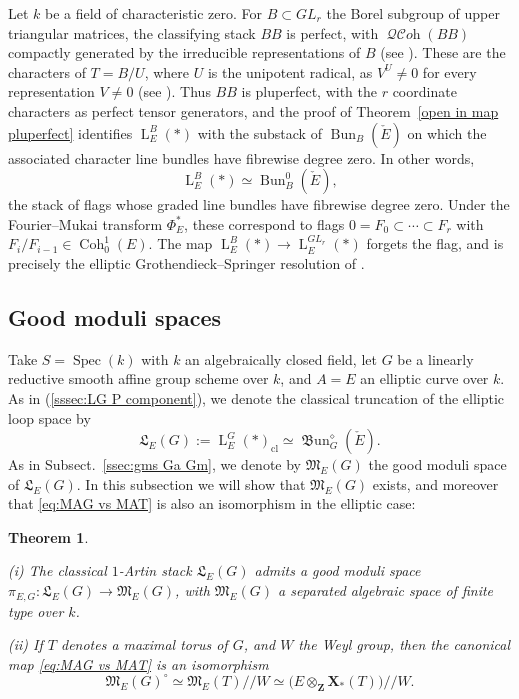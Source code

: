 \documentclass[12pt, oneside]{amsart}
\numberwithin{equation}{section}
\newtheorem{theorem}[subsubsection]{Theorem}
\theoremstyle{remark}
\theoremstyle{plain}
\DeclareMathOperator{\QCOH}{\mathcal{QC}\textit{oh}}
\newcommand{\frM}{\mathfrak{M}}
\newcommand{\frL}{\mathfrak{L}}
\newcommand{\Loop}{\operatorname{L}}
\DeclareMathOperator{\spc}{Spec}
\newcommand{\modmod}{/\!\!/}
\newcommand{\bZ}{\mathbf{Z}}
\newcommand{\FM}{\Phi}
\newcommand{\cl}{{\operatorname{cl}}}
\newcommand{\frBun}{\operatorname{\mathfrak{B}un}}
\begin{document}
Let $k$ be a field of characteristic zero.
For $B \subset GL_r$ the Borel subgroup of upper triangular matrices, the classifying stack $BB$ is perfect, with $\QCOH(BB)$ compactly generated by the irreducible representations of $B$ (see \cite[Thm.~A(c)]{HallRydh}).
These are the characters of $T = B/U$, where $U$ is the unipotent radical, as $V^U \neq 0$ for every representation $V \neq 0$ (see \cite[Exp.~XVII, Prop.~3.2]{SGA3}).
Thus $BB$ is pluperfect, with the $r$ coordinate characters as perfect tensor generators, and the proof of Theorem~\ref{open in map pluperfect} identifies $\Loop_E^B(*)$ with the substack of $\operatorname{Bun}_B(\check E)$ on which the associated character line bundles have fibrewise degree zero.
In other words,
\[
  \Loop_E^B(*)\simeq\operatorname{Bun}_B^0(\check E),
\]
the stack of flags whose graded line bundles have fibrewise degree zero.
Under the Fourier--Mukai transform $\FM^*_{E}$, these correspond to flags $0=F_0\subset\cdots\subset F_r$ with $F_i/F_{i-1}\in\operatorname{Coh}_0^1(E)$.
The map $\Loop_E^B(*)\to\Loop_E^{GL_r}(*)$ forgets the flag, and is precisely the elliptic Grothendieck--Springer resolution of \cite[\S 2]{BNEll}.

\subsection{Good moduli spaces}\label{ssec:gms elliptic}

Take $S=\spc(k)$ with $k$ an algebraically closed field, let $G$ be a linearly reductive smooth affine group scheme over $k$, and $A=E$ an elliptic curve over $k$.
As in (\ref{sssec:LG P component}), we denote the classical truncation of the elliptic loop space by
\[
  \frL_E(G) := \Loop_E^G(*)_{\cl} \simeq
  \frBun_G^\diamond(\check{E}).
\]
As in Subsect.~\ref{ssec:gms Ga Gm}, we denote by $\frM_{E}(G)$ the good moduli space of $\frL_E(G)$.
In this subsection we will show that $\frM_{E}(G)$ exists, and moreover that \eqref{eq:MAG vs MAT} is also an isomorphism in the elliptic case:

\begin{theorem}\label{thm:gms elliptic}\leavevmode

  (i) The classical $1$-Artin stack $\frL_E(G)$ admits a good moduli space $\pi_{E,G} : \frL_E(G) \to \frM_E(G)$, with $\frM_E(G)$ a separated algebraic space of finite type over $k$.

  (ii)
  If $T$ denotes a maximal torus of $G$, and $W$ the Weyl group, then the canonical map \eqref{eq:MAG vs MAT} is an isomorphism
  \[
    \frM_E(G)^{\circ} \simeq
    \frM_E(T)\modmod W \simeq
    \bigl(E \otimes_{\bZ} \mathbf{X}_*(T)\bigr) \modmod W.
  \]
\end{theorem}
\end{document}
